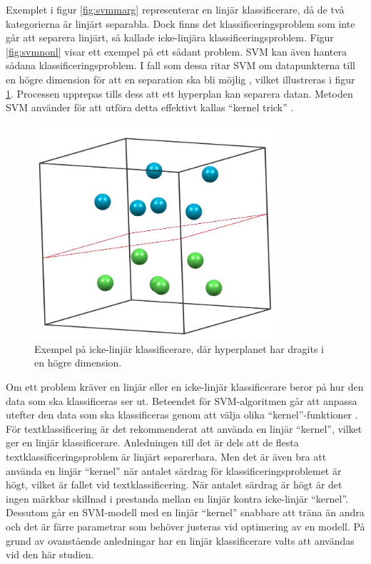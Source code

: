 \documentclass{kaumasters} %
\begin{document}
Exemplet i figur \ref{fig:svmmarg} representerar en linjär klassificerare, då de två kategorierna  är linjärt separabla.  Dock finns det klassificeringsproblem som inte går att separera linjärt, så kallade icke-linjära klassificeringsproblem. Figur \ref{fig:svmnonl} visar ett exempel på ett sådant problem. SVM kan även hantera sådana klassificeringsproblem. I fall som dessa ritar SVM om datapunkterna till en högre dimension för att en separation ska bli möjlig \cite{svm:003}, vilket illustreras i figur \ref{fig:svm3d}. Processen upprepas tills dess att ett hyperplan kan separera datan.  Metoden SVM använder för att utföra detta effektivt kallas “kernel trick” \cite{svm:004}. 

\begin{figure}[H]
\includegraphics[width=9cm]{svm_3d}
\centering
\caption{Exempel på icke-linjär klassificerare, där hyperplanet har dragits i en högre dimension.}
\label{fig:svm3d}
\end{figure} 

Om ett problem kräver en linjär eller en icke-linjär klassificerare beror på hur den data som ska klassificeras ser ut. Beteendet för SVM-algoritmen går att anpassa utefter den data som ska klassificeras genom att välja olika “kernel”-funktioner \cite{svm:006}. För textklassificering är det rekommenderat att använda en linjär “kernel”, vilket ger en linjär klassificerare. Anledningen till det är dels att de flesta textklassificeringsproblem är linjärt separerbara. Men det är även bra att använda en linjär “kernel” när antalet särdrag för klassificeringsproblemet är högt, vilket är fallet vid textklassificering. När antalet särdrag är högt är det ingen märkbar skillnad i prestanda mellan en linjär kontra icke-linjär “kernel”. Dessutom går en SVM-modell med en linjär “kernel” snabbare att träna än andra och det är färre parametrar som behöver justeras vid optimering av en modell. 
På grund av ovanstående anledningar har en linjär klassificerare valts att användas vid den här studien. 
\end{document}

